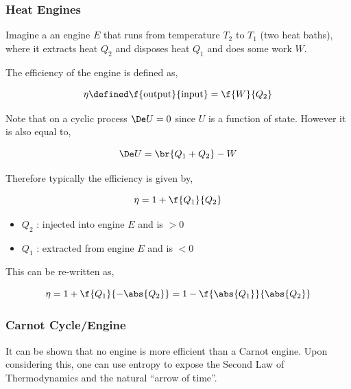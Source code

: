 \documentclass{article}
\begin{document}
\subsubsection{Heat Engines}

Imagine a an engine $E$ that runs from temperature $T_2$ to $T_1$ (two heat baths), where it extracts heat $Q_2$ and disposes heat $Q_1$ and does some work $W$.

\begin{center}
\end{center}

The efficiency of the engine is defined as,

\[ \eta \defined \f{\text{output}}{\text{input}} = \f{W}{Q_2} \]

Note that on a cyclic process $\De U = 0$ since $U$ is a function of state. However it is also equal to,

\[ \De U = \br{Q_1 + Q_2} - W \]

Therefore typically the efficiency is given by,

\[ \eta = 1 + \f{Q_1}{Q_2} \]

\begin{itemize}
    \item $Q_2$ : injected into engine $E$ and is $>0$
    \item $Q_1$ : extracted from engine $E$ and is $<0$
\end{itemize}

This can be re-written as,

\[ \eta = 1 + \f{Q_1}{-\abs{Q_2}} = 1 - \f{\abs{Q_1}}{\abs{Q_2}} \]

\subsubsection{Carnot Cycle/Engine}

It can be shown that no engine is more efficient than a Carnot engine. Upon considering this, one can use entropy to expose the Second Law of Thermodynamics and the natural ``arrow of time''.
\end{document}
